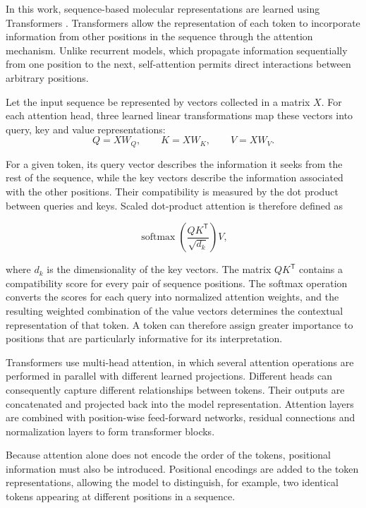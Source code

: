 \documentclass[a4paper,12pt]{article}
\begin{document}
In this work, sequence-based molecular representations are learned using Transformers
\parencite{Vaswani_Shazeer_Parmar_Uszkoreit_Jones_Gomez_Kaiser_Polosukhin_2017}.
Transformers allow the representation of each token to incorporate information from
other positions in the sequence through the attention mechanism. Unlike recurrent
models, which propagate information sequentially from one position to the next,
self-attention permits direct interactions between arbitrary positions.

Let the input sequence be represented by vectors collected in a matrix $X$. For each attention head, three learned linear transformations map these vectors into query, key and value representations:
\begin{equation*}
    Q=XW_Q,\qquad K=XW_K,\qquad V=XW_V.
\end{equation*}

For a given token, its query vector describes the information it seeks from the rest of the sequence, while the key vectors describe the information associated with the other positions. Their compatibility is measured by the dot product between queries and keys. Scaled dot-product attention is therefore defined as

\begin{equation*}
    \operatorname{softmax}
    \left(
    \frac{QK^{\mathsf T}}{\sqrt{d_k}}
    \right)V,
\end{equation*}

\noindent where $d_k$ is the dimensionality of the key vectors. The matrix $QK^{\mathsf T}$ contains a compatibility score for every pair of sequence positions. The softmax operation converts the scores for each query into normalized attention weights, and the resulting weighted combination of the value vectors determines the contextual representation of that token. A token can therefore assign greater importance to positions that are particularly informative for its interpretation.

Transformers use multi-head attention, in which several attention operations are performed in parallel with different learned projections. Different heads can consequently capture different relationships between tokens. Their outputs are concatenated and projected back into the model representation. Attention layers are combined with position-wise feed-forward networks, residual connections and normalization layers to form transformer blocks.

Because attention alone does not encode the order of the tokens, positional information must also be introduced. Positional encodings are added to the token representations, allowing the model to distinguish, for example, two identical tokens appearing at different positions in a sequence.
\end{document}
